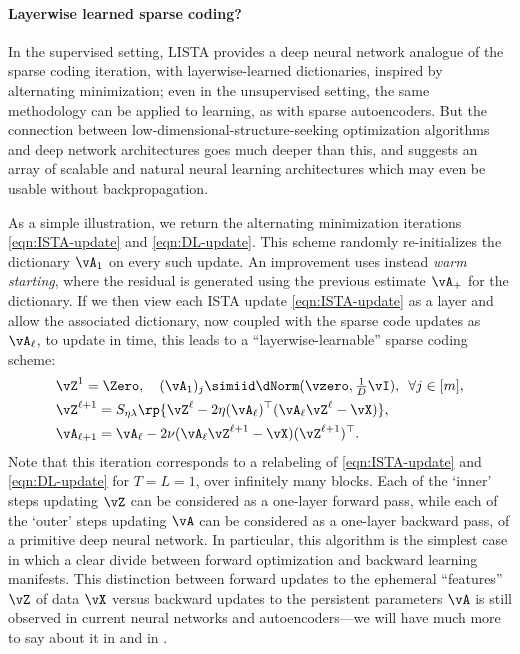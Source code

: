 \documentclass[../../book-main.tex]{subfiles}
\begin{document}
\paragraph{Layerwise learned sparse coding?}

In the supervised setting, LISTA provides a deep neural network analogue of
the sparse coding iteration, with layerwise-learned dictionaries, inspired by
alternating minimization; even in the unsupervised setting, the same methodology
can be applied to learning, as with sparse autoencoders.
But the connection between low-dimensional-structure-seeking
optimization algorithms
and deep network architectures goes much deeper than this, and suggests an array
of scalable and natural neural learning architectures which may even be usable
without backpropagation.

As a simple illustration, we return the alternating minimization iterations
\eqref{eqn:ISTA-update} and \eqref{eqn:DL-update}.
This scheme randomly re-initializes the dictionary $\vA_1$ on every such update.
An improvement uses instead \textit{warm starting}, where the residual is
generated using the previous estimate $\vA_+$ for the dictionary.
If we then view each ISTA update \eqref{eqn:ISTA-update} as a layer and allow
the associated dictionary, now coupled with the sparse code updates as
$\vA_\ell$, to update in time, this leads to a  ``layerwise-learnable'' sparse
coding scheme:
\begin{align}
    & \vZ^{1}
    = \Zero, \quad (\vA_{1})_j
    \simiid \dNorm(\vzero, \tfrac{1}{D}\vI), \enspace \forall j \in [m], \\
    & \vZ^{\ell + 1} = S_{\eta\lambda}\rp{\vZ^{\ell}
        - 2\eta(\vA_{\ell})^\top(\vA_{\ell}\vZ^{\ell}
    - \vX)},\label{eq:ISTA-update-layerwise}\\
    & \vA_{\ell + 1} = \vA_{\ell}- 2\nu (\vA_{\ell}\vZ^{\ell + 1}
    - \vX)(\vZ^{\ell + 1})^\top.
\end{align}
Note that this iteration %
corresponds to a relabeling of \eqref{eqn:ISTA-update} and \eqref{eqn:DL-update}
for $T = L = 1$, over infinitely many blocks.
Each of the `inner' steps updating $\vZ$ can be considered as a one-layer
forward pass, while each of the `outer' steps updating $\vA$ can be considered
as a one-layer  backward pass, of a primitive deep neural network. In
particular, this algorithm is the simplest case in which a clear divide between
forward optimization and backward learning manifests. This
distinction between forward updates to the ephemeral ``features''
$\vZ$ of data $\vX$ versus backward updates to the persistent
parameters $\vA$  is still observed in current neural networks and
autoencoders---we will have much more to say about it in
 and in .
\end{document}
